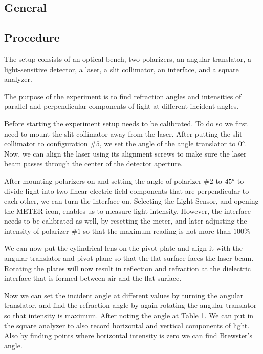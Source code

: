 \documentclass[10pt]{article}
\begin{document}
\subsection*{General}

\subsection*{Procedure} 

The setup consists of an optical bench, two polarizers, an angular translator, a light-sensitive detector, a laser, a slit collimator, an interface, and a square analyzer.

The purpose of the experiment is to find refraction angles and intensities of parallel and perpendicular components of light at different incident angles.

Before starting the experiment setup needs to be calibrated. To do so we first need to mount the slit collimator away from the laser. After putting the slit collimator to configuration $\#5$, we set the angle of the angle translator to $0\degree$. Now, we can align the laser using its alignment screws to make sure the laser beam passes through the center of the detector aperture. 

After mounting polarizers on and setting the angle of polarizer $\#2$ to $45\degree$ to divide light into two linear electric field components that are perpendicular to each other, we can turn the interface on. Selecting the Light Sensor, and opening the METER icon, enables us to measure light intensity. However, the interface needs to be calibrated as well, by resetting the meter, and later adjusting the intensity of polarizer $\#1$ so that the maximum reading is not more than $100\%$

We can now put the cylindrical lens on the pivot plate and align it with the angular translator and pivot plane so that the flat surface faces the laser beam. Rotating the plates will now result in reflection and refraction at the dielectric interface that is formed between air and the flat surface.

Now we can set the incident angle at different values by turning the angular translator, and find the refraction angle by again rotating the angular translator so that intensity is maximum. After noting the angle at Table 1. We can put in the square analyzer to also record horizontal and vertical components of light. Also by finding points where horizontal intensity is zero we can find Brewster's angle.
 
\end{document}
